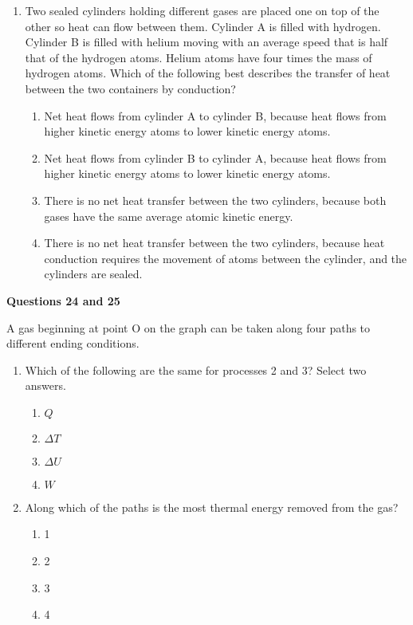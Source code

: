\documentclass{../../oss-apphys}
\begin{document}
\begin{multicols}{2}
\begin{enumerate}[leftmargin=18pt,start=3]
  \item Two sealed cylinders holding different gases are placed one on top of
    the other so heat can flow between them. Cylinder A is filled with
    hydrogen. Cylinder B is filled with helium moving with an average speed
    that is half that of the hydrogen atoms. Helium atoms have four times the
    mass of hydrogen atoms. Which of the following best describes the transfer
    of heat between the two containers by conduction?
    \begin{enumerate}[noitemsep,topsep=0pt,leftmargin=18pt,label=(\Alph*)]
    \item Net heat flows from cylinder A to cylinder B, because heat flows from
      higher kinetic energy atoms to lower kinetic energy atoms.
    \item Net heat flows from cylinder B to cylinder A, because heat flows from
      higher kinetic energy atoms to lower kinetic energy atoms.
    \item There is no net heat transfer between the two cylinders, because both
      gases have the same average atomic kinetic energy.
    \item There is no net heat transfer between the two cylinders, because heat
      conduction requires the movement of atoms between the cylinder, and the
      cylinders are sealed.
    \end{enumerate}
  \end{enumerate}
  
  \textbf{Questions 24 and 25}

  A gas beginning at point O on the graph can be taken along four paths to
  different ending conditions.

  \begin{enumerate}[leftmargin=15pt,start=24]

  \item Which of the following are the same for processes 2 and 3? Select two
    answers.
    \begin{enumerate}[noitemsep,topsep=0pt,leftmargin=18pt,label=(\Alph*)]
    \item $Q$
    \item $\Delta T$
    \item $\Delta U$
    \item $W$
    \end{enumerate}
    
  \item Along which of the paths is the most thermal energy removed from the
    gas?
    \begin{enumerate}[noitemsep,topsep=0pt,leftmargin=18pt,label=(\Alph*)]
      \item\num{1}
      \item\num{2}
      \item\num{3}
      \item\num{4}
    \end{enumerate}
    

\end{enumerate}
\end{multicols}
\end{document}
